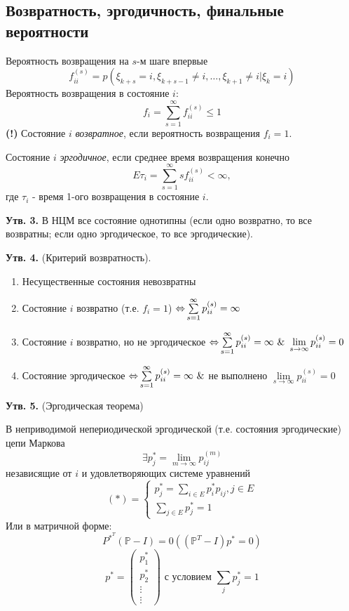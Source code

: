 \subsection{Возвратность, эргодичность, финальные вероятности}

Вероятность возвращения на $s$-м шаге впервые
\[ f_{ii}^{(s)} = p (\xi_{k + s} = i, \xi_{k+s-1} \ne i, \dots, \xi_{k+1} \ne i | \xi_k = i) \]
Вероятность возвращения в состояние $i$:
\[ f_i = \sum_{s=1}^{\infty} f_{ii}^{(s)} \le 1 \]
\textbf{(!)} Состояние $i$ \textit{возвратное}, если вероятность возвращения $f_i = 1$.

Состояние $i$ \textit{эргодичное}, если среднее время возвращения конечно
\[ E \tau_i = \sum_{s=1}^{\infty} s f_{ii}^{(s)} < \infty, \]
где $\tau_i$ - время 1-ого возвращения в состояние $i$.

\textbf{Утв. 3.} В НЦМ все состояние однотипны (если одно возвратно, то все возвратны; если одно эргодическое, то все эргодические).

\textbf{Утв. 4.} (Критерий возвратность).
\begin{enumerate}
	\item Несущественные состояния невозвратны
	\item Состояние $i$ возвратно (т.е. $f_i=1$) $\operatorname{\Leftrightarrow} \sum\limits_{s=1}^{\infty} p_{ii}^{(s)} = \infty$
	\item Состояние $i$ возвратно, но не эргодическое $\operatorname{\Leftrightarrow} \sum\limits_{s=1}^{\infty} p_{ii}^{(s)} = \infty ~ \& ~ \lim\limits_{s \to \infty} p_{ii}^{(s)} = 0$
	\item Состояние эргодическое $\operatorname{\Leftrightarrow} \sum\limits_{s=1}^{\infty} p_{ii}^{(s)} = \infty ~ \&$ не выполнено $\lim\limits_{s \to \infty} p_{ii}^{(s)} = 0$
\end{enumerate}

\textbf{Утв. 5.} (Эргодическая теорема)

\noindent В неприводимой непериодической эргодической (т.е. состояния эргодические) цепи Маркова
\[ \exists p_{j}^{*} = \lim_{m \to \infty} p_{ij}^{(m)} \]
независящие от $i$ и удовлетворяющих системе уравнений
\[
(*) =
\begin{cases}
	p_{j}^{*} = \sum\limits_{i \in E} p_{i}^{*} p_{ij}, j \in E \\
	\sum\limits_{j \in E} p_{j}^{*} = 1
\end{cases}
\]
Или в матричной форме:
\[
P^{*^T} (\mathbb{P} - I) = 0 ( (\mathbb{P}^T - I)p^* = 0 )
\]
\[
p^{*}=
\begin{pmatrix}
	p_1^* \\ p_2^* \\ \vdots \\ \vdots
\end{pmatrix}
\text{ с условием } \sum_j p_j^* = 1
\]

